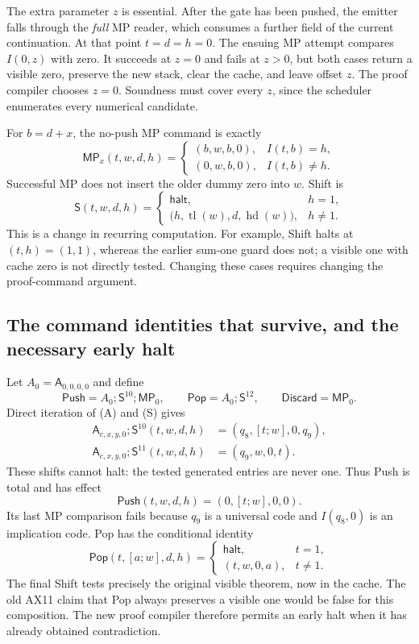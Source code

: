 The extra parameter $z$ is essential. After the gate has been pushed,
the emitter falls through the \emph{full} MP reader, which consumes a
further field of the current continuation. At that point $t=d=h=0$.
The ensuing MP attempt compares $I(0,z)$ with zero. It succeeds at $z=0$
and fails at $z>0$, but both cases return a visible zero, preserve the
new stack, clear the cache, and leave offset $z$. The proof compiler
chooses $z=0$. Soundness must cover every $z$, since the scheduler
enumerates every numerical candidate.

For $b=d+x$, the no-push MP command is exactly
\[
 \mathsf{MP}_x(t,w,d,h)=
 \begin{cases}
   (b,w,b,0),& I(t,b)=h,\\
   (0,w,b,0),& I(t,b)\ne h.
 \end{cases}
 \tag{MP}
\]
Successful MP does not insert the older dummy zero into $w$. Shift is
\[
 \mathsf S(t,w,d,h)=
 \begin{cases}
   \mathsf{halt},&h=1,\\
   \bigl(h,\operatorname{tl}(w),d,\operatorname{hd}(w)\bigr),&h\ne1.
 \end{cases}
 \tag{S}
\]
This is a change in recurring computation. For example, Shift halts at
$(t,h)=(1,1)$, whereas the earlier sum-one guard does not; a visible one
with cache zero is not directly tested. Changing these cases requires
changing the proof-command argument.

\subsection{The command identities that survive, and the necessary early halt}

Let $A_0=\mathsf A_{0,0,0,0}$ and define
\[
 \mathsf{Push}=A_0;\mathsf S^{10};\mathsf{MP}_0,
 \qquad
 \mathsf{Pop}=A_0;\mathsf S^{12},
 \qquad
 \mathsf{Discard}=\mathsf{MP}_0.
\]
Direct iteration of (A) and (S) gives
\[
 \begin{aligned}
 \mathsf A_{c,x,y,0};\mathsf S^{10}(t,w,d,h)
      &=(q_8,[t;w],0,q_9),\\
 \mathsf A_{c,x,y,0};\mathsf S^{11}(t,w,d,h)
      &=(q_9,w,0,t).
 \end{aligned}
\]
These shifts cannot halt: the tested generated entries are never one.
Thus Push is total and has effect
\[
       \mathsf{Push}(t,w,d,h)=(0,[t;w],0,0).
\]
Its last MP comparison fails because $q_9$ is a universal code and
$I(q_8,0)$ is an implication code. Pop has the conditional identity
\[
 \mathsf{Pop}(t,[a;w],d,h)=
 \begin{cases}
   \mathsf{halt},&t=1,\\
   (t,w,0,a),&t\ne1.
 \end{cases}
 \tag{Pop}
\]
The final Shift tests precisely the original visible theorem, now in the
cache. The old AX11 claim that Pop always preserves a visible one would
be false for this composition. The new proof compiler therefore permits
an early halt when it has already obtained contradiction.

